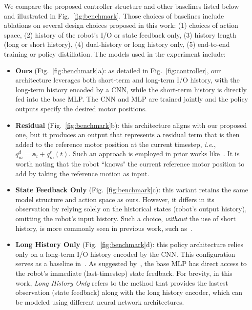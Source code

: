 We compare the proposed controller structure and other baselines listed below and illustrated in Fig.~\ref{fig:benchmark}. Those choices of baselines include ablations on several design choices proposed in this work: (1) choices of action space, (2) history of the robot's I/O or state feedback only, (3) history length (long or short history), (4) dual-history or long history only, (5) end-to-end training or policy distillation. 
The models used in the experiment include:
\begin{itemize}[leftmargin=9pt]
    \small
    \item \textbf{Ours} (Fig.~\ref{fig:benchmark}a): 
    as detailed in Fig.~\ref{fig:controller}, our architecture leverages both short-term and long-term I/O history, with the long-term history encoded by a CNN, while the short-term history is directly fed into the base MLP. The CNN and MLP are trained jointly and the policy outputs specify the desired motor positions.
    \item \textbf{Residual} (Fig.~\ref{fig:benchmark}b): 
    this architecture aligns with our proposed one, but it produces an output that represents a residual term that is then added to the reference motor position at the current timestep, \textit{i.e.}, $q^d_m = \mathbf{a}_t + q^r_m(t)$. Such an approach is employed in prior works like~\cite{lee2020learning,xie2020learning,siekmann2020learning}. It is worth noting that the robot “knows" the current reference motor position to add by taking the reference motion as input.
    \item \textbf{State Feedback Only} (Fig.~\ref{fig:benchmark}c):
    this variant retains the same model structure and action space as ours. However, it differs in its observation by relying solely on the historical states (robot's output history), omitting the robot's input history. Such a choice, \emph{without} the use of short history, is more commonly seen in previous work, such as~\cite{lee2020learning,siekmann2020learning,siekmann2021sim,crowley2023optimizing}.
    \item \textbf{Long History Only} (Fig.~\ref{fig:benchmark}d): this policy architecture relies only on a long-term I/O history encoded by the CNN. This configuration serves as a baseline in~\cite{kumar2021rma}. 
    As suggested by~\cite{peng2018sim}, the base MLP has direct access to the robot's immediate (last-timestep) state feedback. For brevity, in this work, \emph{Long History Only} refers to the method that provides the lastest observation (state feedback) along with the long history encoder, which can be modeled using different neural network architectures.

\end{itemize}
